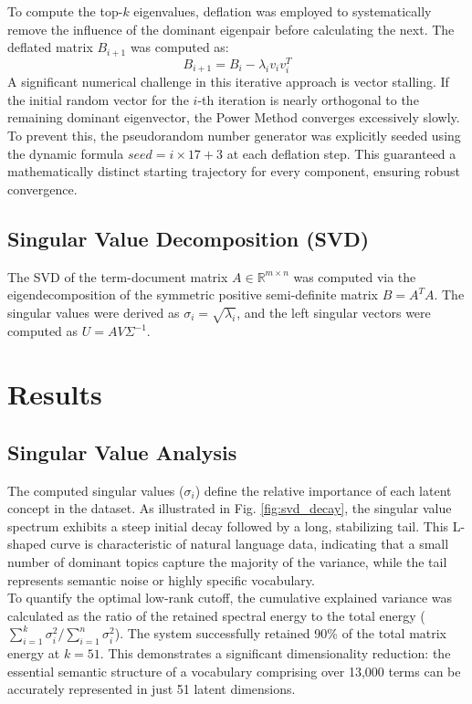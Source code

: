 \documentclass[conference]{IEEEtran}
\begin{document}
To compute the top-$k$ eigenvalues, deflation was employed to systematically remove the influence of the dominant eigenpair before calculating the next. The deflated matrix $B_{i+1}$ was computed as:
\begin{equation}
    B_{i+1} = B_i - \lambda_i v_i v_i^T
\end{equation}
A significant numerical challenge in this iterative approach is vector stalling. If the initial random vector for the $i$-th iteration is nearly orthogonal to the remaining dominant eigenvector, the Power Method converges excessively slowly. To prevent this, the pseudorandom number generator was explicitly seeded using the dynamic formula $seed = i \times 17 + 3$ at each deflation step. This guaranteed a mathematically distinct starting trajectory for every component, ensuring robust convergence.

\subsection{Singular Value Decomposition (SVD)}
The SVD of the term-document matrix $A \in \mathbb{R}^{m \times n}$ was computed via the eigendecomposition of the symmetric positive semi-definite matrix $B = A^T A$. The singular values were derived as $\sigma_i = \sqrt{\lambda_i}$, and the left singular vectors were computed as $U = A V \Sigma^{-1}$.

\section{Results}

\subsection{Singular Value Analysis}
The computed singular values ($\sigma_i$) define the relative importance of each latent concept in the dataset. As illustrated in Fig. \ref{fig:svd_decay}, the singular value spectrum exhibits a steep initial decay followed by a long, stabilizing tail. This L-shaped curve is characteristic of natural language data, indicating that a small number of dominant topics capture the majority of the variance, while the tail represents semantic noise or highly specific vocabulary.
\\
To quantify the optimal low-rank cutoff, the cumulative explained variance was calculated as the ratio of the retained spectral energy to the total energy ($\sum_{i=1}^k \sigma_i^2 / \sum_{i=1}^n \sigma_i^2$). The system successfully retained 90\% of the total matrix energy at $k=51$. This demonstrates a significant dimensionality reduction: the essential semantic structure of a vocabulary comprising over 13,000 terms can be accurately represented in just 51 latent dimensions.
\end{document}
